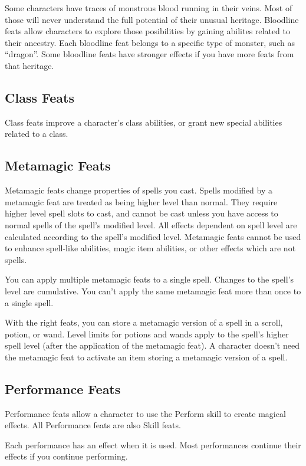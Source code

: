 Some characters have traces of monstrous blood running in their veins.
Most of those will never understand the full potential of their unusual heritage.
Bloodline feats allow characters to explore those posibilities by gaining abilites related to their ancestry.
Each bloodline feat belongs to a specific type of monster, such as ``dragon''.
Some bloodline feats have stronger effects if you have more feats from that heritage.

\subsection{Class Feats}
Class feats improve a character's class abilities, or grant new special abilities related to a class.

\subsection{Metamagic Feats}
Metamagic feats change properties of spells you cast.
Spells modified by a metamagic feat are treated as being higher level than normal.
They require higher level spell slots to cast, and cannot be cast unless you have access to normal spells of the spell's modified level.
All effects dependent on spell level are calculated according to the spell's modified level.
Metamagic feats cannot be used to enhance spell-like abilities, magic item abilities, or other effects which are not spells.

You can apply multiple metamagic feats to a single spell.
Changes to the spell's level are cumulative.
You can't apply the same metamagic feat more than once to a single spell.

With the right feats, you can store a metamagic version of a spell in a scroll, potion, or wand.
Level limits for potions and wands apply to the spell's higher spell level (after the application of the metamagic feat).
A character doesn't need the metamagic feat to activate an item storing a metamagic version of a spell.

\subsection{Performance Feats}
Performance feats allow a character to use the Perform skill to create magical effects.
All Performance feats are also Skill feats.

Each performance has an effect when it is used.
Most performances continue their effects if you continue performing.


